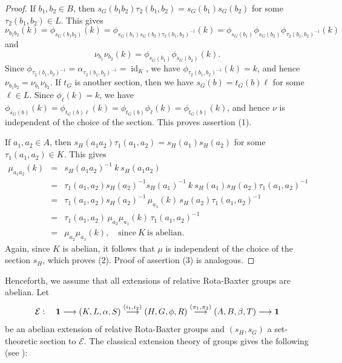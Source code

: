 \documentclass[11pt]{amsart}
\theoremstyle{thrm}
\theoremstyle{plain}
\theoremstyle{definition}
\newcommand{\Id}{\operatorname{id}}
\numberwithin{equation}{section}
\begin{document}
\begin{proof}
If $b_1, b_2 \in B$, then $s_G(b_1b_2) \tau_2(b_1, b_2)= s_G(b_1) s_G(b_2) $ for some $ \tau_2(b_1, b_2) \in L$. This gives
$$\nu_{b_1b_2}(k)= \phi_{s_G(b_1b_2)}(k)= \phi_{s_G(b_1) s_G(b_2)  \tau_2(b_1, b_2)^{-1}}(k)=\phi_{s_G(b_1)} \phi_{s_G(b_2)} \phi_{ \tau_2(b_1, b_2)^{-1}}(k)$$
and
$$\nu_{b_1}\nu_{b_2}(k)= \phi_{s_G(b_1)} \phi_{s_G(b_2)}(k).$$
Since $\phi_{ \tau_2(b_1, b_2)^{-1}}=\alpha_{\tau_2(b_1, b_2)^{-1}}=\Id_K$, we have $\phi_{ \tau_2(b_1, b_2)^{-1}}(k)=k$, and hence $\nu_{b_1b_2}= \nu_{b_1}\nu_{b_2}$. If $t_G$ is another section, then we have $s_G(b)=t_G(b) \ell$ for some $\ell \in L$. Since  $\phi_\ell(k)=k$, we have $\phi_{s_G(b)}(k)= \phi_{t_G(b) \ell}(k)=\phi_{t_G(b)} \phi_{\ell}(k)=\phi_{t_G(b)}(k)$, and hence $\nu$ is independent of the choice of the section. This proves assertion (1).
\par

If $a_1, a_2 \in A$, then $s_H(a_1a_2) \tau_1(a_1, a_2)= s_H(a_1) s_H(a_2)$ for some $ \tau_1(a_1, a_2) \in K$. This gives
\begin{eqnarray*}
\mu_{a_1a_2}(k) &=& s_H(a_1a_2)^{-1} ~k ~s_H(a_1a_2)\\
 &=&   \tau_1(a_1, a_2) s_H(a_2)^{-1}s_H(a_1)^{-1} ~k~s_H(a_1) s_H(a_2) \tau_1(a_1, a_2)^{-1}\\
 &=&   \tau_1(a_1, a_2) s_H(a_2)^{-1} \, \mu_{a_1}(k) \,s_H(a_2) \tau_1(a_1, a_2)^{-1}\\
  &=&   \tau_1(a_1, a_2) \, \mu_{a_2}\mu_{a_1}(k) \, \tau_1(a_1, a_2)^{-1}\\
    &=&   \mu_{a_2}\mu_{a_1}(k), \quad \textrm{since}~ K~ \textrm{is abelian}.
\end{eqnarray*}
Again, since $K$ is abelian, it follows that $\mu$ is independent of the choice of the section $s_H$, which proves (2). Proof of assertion (3) is analogous.
\end{proof}

Henceforth, we assume that all extensions of relative Rota-Baxter groups are abelian. Let  $$\mathcal{E} : \quad {\bf 1} \longrightarrow (K,L, \alpha,S ) \stackrel{(i_1, i_2)}{\longrightarrow}  (H,G, \phi, R) \stackrel{(\pi_1, \pi_2)}{\longrightarrow} (A,B, \beta, T) \longrightarrow {\bf 1}$$
be an abelian extension of relative Rota-Baxter groups and $(s_H, s_G)$ a set-theoretic section to $\mathcal{E}$. The classical extension theory of groups gives the following (see \cite{MR0672956}):
\end{document}
